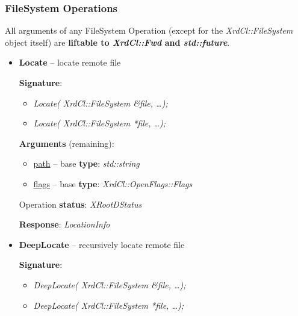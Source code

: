 \documentclass{article}
\begin{document}
	    \subsubsection{FileSystem Operations}
	    
	    	All arguments of any FileSystem Operation (except for the \textit{XrdCl::FileSystem} object itself) are \textbf{liftable to \textit{XrdCl::Fwd} and \textit{std::future}}.
            \begin{itemize}

                \item \begin{samepage} \textbf{Locate} -- locate remote file

                    \textbf{Signature}:
                    \begin{itemize}
                        \item \textit{Locate( XrdCl::FileSystem \&file, \ldots);}
                        \item \textit{Locate( XrdCl::FileSystem *file, \ldots );}
                    \end{itemize}

                    \textbf{Arguments} (remaining):
                    \begin{itemize}
                        \item \underline{path} -- base \textbf{type}: \textit{std::string}
                        \item \underline{flags} -- base \textbf{type}: \textit{XrdCl::OpenFlags::Flags}
                    \end{itemize}

                    Operation \textbf{status}: \textit{XRootDStatus}

                    \textbf{Response}: \textit{LocationInfo}
                    
                \end{samepage}
                    
                \item \begin{samepage} \textbf{DeepLocate} -- recursively locate remote file

                    \textbf{Signature}:
                    \begin{itemize}
                        \item \textit{DeepLocate( XrdCl::FileSystem \&file, \ldots);}
                        \item \textit{DeepLocate( XrdCl::FileSystem *file, \ldots );}
                    \end{itemize}


\end{samepage}
\end{itemize}
\end{document}
